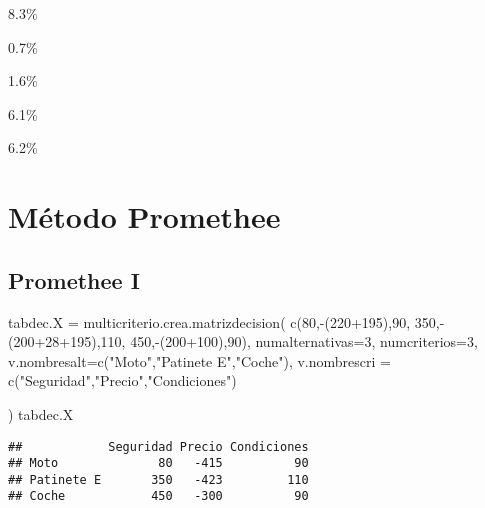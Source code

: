 \documentclass[
]{article}
\newenvironment{Shaded}{\begin{snugshade}}{\end{snugshade}}
\newcommand{\AttributeTok}[1]{\textcolor[rgb]{0.77,0.63,0.00}{#1}}
\newcommand{\DecValTok}[1]{\textcolor[rgb]{0.00,0.00,0.81}{#1}}
\newcommand{\FunctionTok}[1]{\textcolor[rgb]{0.00,0.00,0.00}{#1}}
\newcommand{\NormalTok}[1]{#1}
\newcommand{\OtherTok}[1]{\textcolor[rgb]{0.56,0.35,0.01}{#1}}
\newcommand{\SpecialCharTok}[1]{\textcolor[rgb]{0.00,0.00,0.00}{#1}}
\newcommand{\StringTok}[1]{\textcolor[rgb]{0.31,0.60,0.02}{#1}}
\begin{document}
{8.3\%}

{0.7\%}

{1.6\%}

{6.1\%}

{ 6.2\% }

\hypertarget{muxe9todo-promethee}{%
\section{Método Promethee}\label{muxe9todo-promethee}}

\hypertarget{promethee-i}{%
\subsection{Promethee I}\label{promethee-i}}

\begin{Shaded}
\begin{Highlighting}[]
\NormalTok{tabdec.X }\OtherTok{=} \FunctionTok{multicriterio.crea.matrizdecision}\NormalTok{(}
  \FunctionTok{c}\NormalTok{(}\DecValTok{80}\NormalTok{,}\SpecialCharTok{{-}}\NormalTok{(}\DecValTok{220}\SpecialCharTok{+}\DecValTok{195}\NormalTok{),}\DecValTok{90}\NormalTok{,}
   \DecValTok{350}\NormalTok{,}\SpecialCharTok{{-}}\NormalTok{(}\DecValTok{200}\SpecialCharTok{+}\DecValTok{28}\SpecialCharTok{+}\DecValTok{195}\NormalTok{),}\DecValTok{110}\NormalTok{,}
   \DecValTok{450}\NormalTok{,}\SpecialCharTok{{-}}\NormalTok{(}\DecValTok{200}\SpecialCharTok{+}\DecValTok{100}\NormalTok{),}\DecValTok{90}\NormalTok{),}
  \AttributeTok{numalternativas=}\DecValTok{3}\NormalTok{,}
  \AttributeTok{numcriterios=}\DecValTok{3}\NormalTok{,}
  \AttributeTok{v.nombresalt=}\FunctionTok{c}\NormalTok{(}\StringTok{"Moto"}\NormalTok{,}\StringTok{"Patinete E"}\NormalTok{,}\StringTok{"Coche"}\NormalTok{),}
  \AttributeTok{v.nombrescri =} \FunctionTok{c}\NormalTok{(}\StringTok{"Seguridad"}\NormalTok{,}\StringTok{"Precio"}\NormalTok{,}\StringTok{"Condiciones"}\NormalTok{)}
                                                    
\NormalTok{)}
\NormalTok{tabdec.X}
\end{Highlighting}
\end{Shaded}

\begin{verbatim}
##            Seguridad Precio Condiciones
## Moto              80   -415          90
## Patinete E       350   -423         110
## Coche            450   -300          90
\end{verbatim}
\end{document}
